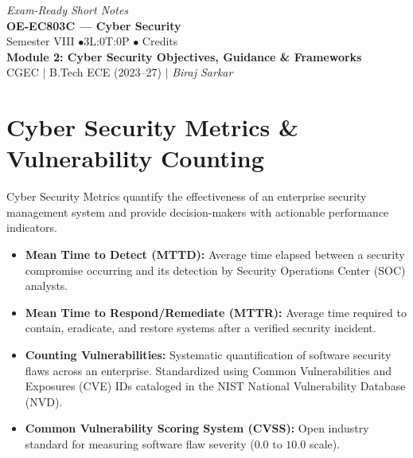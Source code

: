 \documentclass[12pt,a4paper]{article}
\begin{document}
\begin{center}
  \hfill \textit{Exam-Ready Short Notes} \\
  \vspace{6pt}
  {\LARGE\bfseries\color{myred} OE-EC803C --- Cyber Security}\\[5pt]
  {\normalsize\color{mydark} Semester VIII \quad$\bullet$\quad 3L:0T:0P \quad$\bullet$ Credits}\\[3pt]
  {\normalsize\color{myteal}\textbf{Module 2: Cyber Security Objectives, Guidance \& Frameworks}}\\[3pt]
  {\small\color{mydark} CGEC \;$|$\; B.Tech ECE (2023--27) \;$|$\; \textit{Biraj Sarkar}}
\end{center}
\vspace{2pt}
\noindent{\color{myred}\rule{\linewidth}{1.5pt}}
\vspace{2pt}

\hypersetup{linkcolor=mydark}
\tableofcontents
\hypersetup{linkcolor=myteal}
\newpage

\section{Cyber Security Metrics \& Vulnerability Counting}

Cyber Security Metrics quantify the effectiveness of an enterprise security management system and provide decision-makers with actionable performance indicators.

\begin{tcolorbox}[defbox, title={\textbf{Definition: Operational Security Metrics \& Vulnerability Counting}}]
\begin{itemize}[leftmargin=*, itemsep=3pt]
  \item \textbf{Mean Time to Detect (MTTD):} Average time elapsed between a security compromise occurring and its detection by Security Operations Center (SOC) analysts.
  \item \textbf{Mean Time to Respond/Remediate (MTTR):} Average time required to contain, eradicate, and restore systems after a verified security incident.
  \item \textbf{Counting Vulnerabilities:} Systematic quantification of software security flaws across an enterprise. Standardized using Common Vulnerabilities and Exposures (CVE) IDs cataloged in the NIST National Vulnerability Database (NVD).
  \item \textbf{Common Vulnerability Scoring System (CVSS):} Open industry standard for measuring software flaw severity ($0.0\text{ to }10.0$ scale).
\end{itemize}
\end{tcolorbox}
\end{document}
